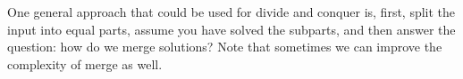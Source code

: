 
One general approach that could be used for divide and conquer is, first, split the input into equal parts, assume you have solved the subparts, and then answer the question: how do we merge solutions? Note that sometimes we can improve the complexity of merge as well.
